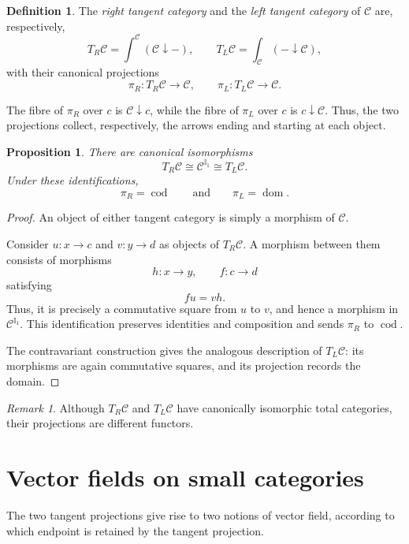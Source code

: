 \documentclass[12pt]{amsart}
\newtheorem{proposition}[teo]{Proposition}
\theoremstyle{definition}
\newtheorem{definition}[teo]{Definition}
\theoremstyle{remark}
\newtheorem{remark}[teo]{Remark}
\numberwithin{figure}{section}%
\newcommand{\CC}{\mathcal{C}}
\begin{document}
\begin{definition}\label{def:tangent_categories}
The \emph{right tangent category} and the \emph{left tangent category} of
\(\CC\) are, respectively,
\[
T_R\CC
=
\int^\CC(\CC\downarrow-),
\qquad
T_L\CC
=
\int_\CC(-\downarrow\CC),
\]
with their canonical projections
\[
\pi_R\colon T_R\CC\longrightarrow\CC,
\qquad
\pi_L\colon T_L\CC\longrightarrow\CC.
\]
\end{definition}

The fibre of \(\pi_R\) over \(c\) is \(\CC\downarrow c\), while the fibre
of \(\pi_L\) over \(c\) is \(c\downarrow\CC\). Thus, the two projections
collect, respectively, the arrows ending and starting at each object.

\begin{proposition}\label{prop:tangent_arrow_category}
There are canonical isomorphisms
\[
T_R\CC\cong\CC^{\mathbb I_1}\cong T_L\CC.
\]
Under these identifications,
\[
\pi_R=\operatorname{cod}
\qquad\text{and}\qquad
\pi_L=\operatorname{dom}.
\]
\end{proposition}
\begin{proof}
An object of either tangent category is simply a morphism of \(\CC\).

Consider \(u\colon x\to c\) and \(v\colon y\to d\) as objects of
\(T_R\CC\). A morphism between them consists of morphisms
\[
h\colon x\longrightarrow y,
\qquad
f\colon c\longrightarrow d
\]
satisfying
\[
fu=vh.
\]
Thus, it is precisely a commutative square from \(u\) to \(v\), and hence
a morphism in \(\CC^{\mathbb I_1}\). This identification preserves
identities and composition and sends \(\pi_R\) to
\(\operatorname{cod}\).

The contravariant construction gives the analogous description of
\(T_L\CC\): its morphisms are again commutative squares, and its
projection records the domain.
\end{proof}

\begin{remark}
Although \(T_R\CC\) and \(T_L\CC\) have canonically isomorphic total
categories, their projections are different functors.
\end{remark}

\section{Vector fields on small categories}
\label{sec:vector_fields}

The two tangent projections give rise to two notions of vector field,
according to which endpoint is retained by the tangent projection.
\end{document}

